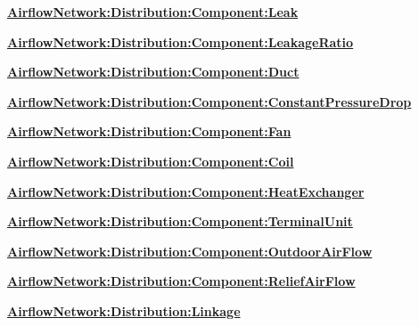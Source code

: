 \textbf{\hyperref[airflownetworkdistributioncomponentleak]{AirflowNetwork:Distribution:Component:Leak}}

\textbf{\hyperref[airflownetworkdistributioncomponentleakageratio]{AirflowNetwork:Distribution:Component:LeakageRatio}}

\textbf{\hyperref[airflownetworkdistributioncomponentduct]{AirflowNetwork:Distribution:Component:Duct}}

\textbf{\hyperref[airflownetworkdistributioncomponentconstantpressuredrop]{AirflowNetwork:Distribution:Component:ConstantPressureDrop}}

\textbf{\hyperref[airflownetworkdistributioncomponentfan]{AirflowNetwork:Distribution:Component:Fan}}

\textbf{\hyperref[airflownetworkdistributioncomponentcoil]{AirflowNetwork:Distribution:Component:Coil}}

\textbf{\hyperref[airflownetworkdistributioncomponentheatexchanger]{AirflowNetwork:Distribution:Component:HeatExchanger}}

\textbf{\hyperref[airflownetworkdistributioncomponentterminalunit]{AirflowNetwork:Distribution:Component:TerminalUnit}}

\textbf{\hyperref[airflowNetworkdistributioncomponentoutdoorairflow]{AirflowNetwork:Distribution:Component:OutdoorAirFlow}}

\textbf{\hyperref[airflowNetworkdistributioncomponentreliefairflow]{AirflowNetwork:Distribution:Component:ReliefAirFlow}}

\textbf{\hyperref[airflownetworkdistributionlinkage]{AirflowNetwork:Distribution:Linkage}}

\textbf{~}

